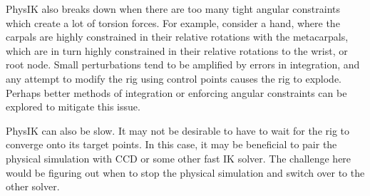 \documentclass[10pt,twocolumn,letterpaper]{article}
\begin{document}
PhysIK also breaks down when there are too many tight angular constraints which create a lot of torsion forces. For example, consider a hand, where the carpals are highly constrained in their relative rotations with the metacarpals, which are in turn highly constrained in their relative rotations to the wrist, or root node. Small perturbations tend to be amplified by errors in integration, and any attempt to modify the rig using control points causes the rig to explode. Perhaps better methods of integration or enforcing angular constraints can be explored to mitigate this issue.

PhysIK can also be slow. It may not be desirable to have to wait for the rig to converge onto its target points. In this case, it may be beneficial to pair the physical simulation with CCD or some other fast IK solver. The challenge here would be figuring out when to stop the physical simulation and switch over to the other solver.



\end{document}
